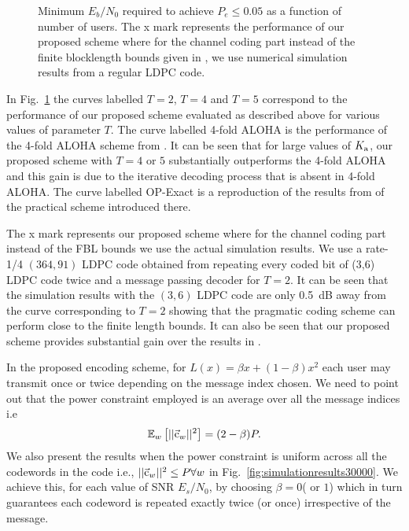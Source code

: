\begin{figure}[!ht]
\centering
 \resizebox{0.85\textwidth}{!}{}
  \caption{Minimum $E_b/N_0$ required to achieve $P_e\leq 0.05$ as a function of number of users. The x mark represents the performance of our proposed scheme where for the channel coding part instead of the finite blocklength bounds given in \cite{polyanskiy2017perspective}, we use numerical simulation results from a regular LDPC code.}
  \label{fig:simulationresults_new}
\end{figure}
 
In Fig.~\ref{fig:simulationresults_new} the curves labelled $T=2$, $T=4$ and $T=5$ correspond to the performance of our proposed scheme evaluated as described above for various values of parameter $T$. The curve labelled 4-fold ALOHA is the performance of the 4-fold ALOHA scheme from \cite{ordentlich2017low}.
 It can be seen that for large values of $K_{\text{a}}$, our proposed scheme with $T=4$ or $5$ substantially outperforms the 4-fold ALOHA and this gain is due to the iterative decoding process that is absent in 4-fold ALOHA. The curve labelled OP-Exact is a reproduction of the results from \cite{ordentlich2017low} of the practical scheme introduced there. 
 
 The x mark represents our proposed scheme where for the channel coding part instead of the FBL bounds we use the actual simulation results. We use a rate-1/4 $(364,91)$ LDPC code obtained from repeating every coded bit of (3,6) LDPC code twice and a message passing decoder for $T=2$. It can be seen that the simulation results with the $(3,6)$ LDPC code are only 0.5~dB away from the curve corresponding to $T=2$ showing that the pragmatic coding scheme can perform close to the finite length bounds. It can also be seen that our proposed scheme provides substantial gain over the results in \cite{ordentlich2017low}.
 
In the proposed encoding scheme, for $L(x)=\beta x+(1-\beta)x^2$ each user may transmit once or twice depending on the message index chosen. We need to point out that the power constraint employed is an average over all the message indices i.e
\[
\mathbb{E}_{w}\left[||\vec{\mathrm{c}}_w||^2\right]=(2-\beta)P.
\]
We also present the results when the power constraint is uniform across all the codewords in the code i.e., $||\vec{\mathrm{c}}_w||^2\leq P \forall w$ in Fig.~\ref{fig:simulationresults30000}. We achieve this, for each value of SNR $E_s/N_0$, by choosing $\beta=0$( or $1$) which in turn guarantees each codeword is repeated exactly twice (or once) irrespective of the message.

